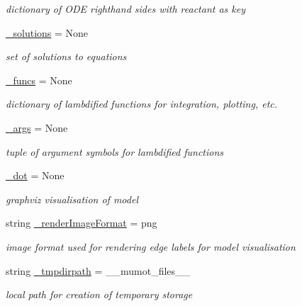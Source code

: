 \begin{DoxyCompactItemize}
\begin{DoxyCompactList}\small\item\em dictionary of O\+DE righthand sides with reactant as key \end{DoxyCompactList}\item 
\hyperlink{class_mu_mo_t_1_1_mu_mo_tmodel_a31c9407d55747598fa4c9efdd6f9293d}{\+\_\+solutions} = None
\begin{DoxyCompactList}\small\item\em set of solutions to equations \end{DoxyCompactList}\item 
\hyperlink{class_mu_mo_t_1_1_mu_mo_tmodel_a8ef9f9e4473f46043da1484716b18268}{\+\_\+funcs} = None
\begin{DoxyCompactList}\small\item\em dictionary of lambdified functions for integration, plotting, etc. \end{DoxyCompactList}\item 
\hyperlink{class_mu_mo_t_1_1_mu_mo_tmodel_a04c0353d4e8a6c3f2e0a1fb36ed9a832}{\+\_\+args} = None
\begin{DoxyCompactList}\small\item\em tuple of argument symbols for lambdified functions \end{DoxyCompactList}\item 
\hyperlink{class_mu_mo_t_1_1_mu_mo_tmodel_aaabcff4440dc0ded9f9f880c9f86c6c1}{\+\_\+dot} = None
\begin{DoxyCompactList}\small\item\em graphviz visualisation of model \end{DoxyCompactList}\item 
string \hyperlink{class_mu_mo_t_1_1_mu_mo_tmodel_a385c519c2aed996e4bad454f870fed0c}{\+\_\+render\+Image\+Format} = \textquotesingle{}png\textquotesingle{}
\begin{DoxyCompactList}\small\item\em image format used for rendering edge labels for model visualisation \end{DoxyCompactList}\item 
string \hyperlink{class_mu_mo_t_1_1_mu_mo_tmodel_a4ac4f3325e967c92d03e2c4e023a0d5d}{\+\_\+tmpdirpath} = \textquotesingle{}\+\_\+\+\_\+mumot\+\_\+files\+\_\+\+\_\+\textquotesingle{}
\begin{DoxyCompactList}\small\item\em local path for creation of temporary storage \end{DoxyCompactList}\item 

\end{DoxyCompactItemize}
